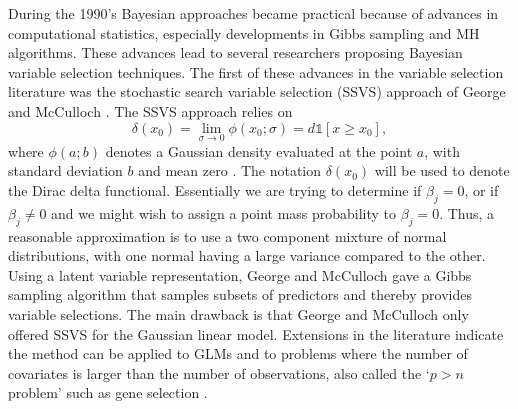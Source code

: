  During the 1990's Bayesian approaches became practical because of advances in computational statistics, especially developments in Gibbs sampling and MH algorithms. These advances lead to several researchers proposing Bayesian variable selection techniques. The first of these advances in the variable selection literature was the stochastic search variable selection (SSVS) approach of George and McCulloch \cite{george1993variable}.  The SSVS approach relies on  
 \begin{equation}
  \delta(x_0) = \lim_{\sigma\to 0}\phi(x_0;\sigma) = d\mathds{1}[x\geq x_0],
 \end{equation}
where $\phi(a;b)$ denotes a Gaussian density evaluated at the point $a$, with standard deviation $b$ and mean zero \cite{geweke1996variable,mitchell1988bayesian}. The notation $ \delta(x_0)$ will be used to denote the Dirac delta functional. Essentially we are trying to determine if $\beta_j=0$, or if $\beta_j\neq0$ and we might wish to assign a point mass probability to $\beta_j=0$. Thus, a reasonable approximation is to use a two component mixture of normal distributions, with one normal having a large variance compared to the other. Using a latent variable representation, George and McCulloch gave a Gibbs sampling algorithm that samples subsets of predictors and thereby provides variable selections.  The main drawback is that George and McCulloch only offered SSVS for the Gaussian linear model. Extensions in the literature indicate the method can be applied to GLMs and to problems where the number of covariates is larger than the number of observations, also called the `$p>n$ problem' such as gene selection \cite{yi2003stochastic,george2000variable}.  
     
